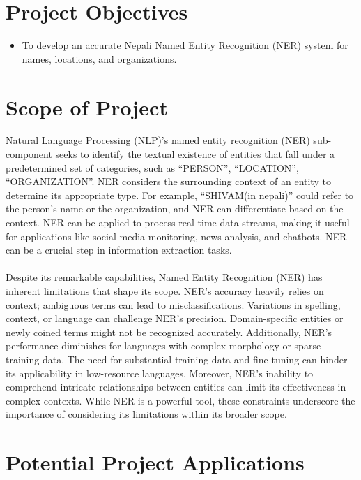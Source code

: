  
\section{Project Objectives}
\vspace{10pt}
\begin{itemize}
    \item To develop an accurate Nepali Named Entity Recognition (NER) system for names, locations, and organizations.
\end{itemize}
   
\section{Scope of Project}
\vspace{10pt}

Natural Language Processing (NLP)’s named entity recognition (NER) sub-component seeks to identify the textual existence of entities that fall under a predetermined set of categories, such as “PERSON”, “LOCATION”, “ORGANIZATION”. NER considers the surrounding context of an entity to determine its appropriate type. For example, “SHIVAM(in nepali)” could refer to the person’s name or the organization, and NER can differentiate based on the context. NER can be applied to process real-time data streams, making it useful for applications like social media monitoring, news analysis, and chatbots. NER can be a crucial step in information extraction tasks. \\
\\
Despite its remarkable capabilities, Named Entity Recognition (NER) has inherent limitations that shape its scope. NER's accuracy heavily relies on context; ambiguous terms can lead to misclassifications. Variations in spelling, context, or language can challenge NER's precision. Domain-specific entities or newly coined terms might not be recognized accurately. Additionally, NER's performance diminishes for languages with complex morphology or sparse training data. The need for substantial training data and fine-tuning can hinder its applicability in low-resource languages. Moreover, NER's inability to comprehend intricate relationships between entities can limit its effectiveness in complex contexts. While NER is a powerful tool, these constraints underscore the importance of considering its limitations within its broader scope.


 
\newpage
\section{Potential Project Applications}
\vspace{10pt} %

